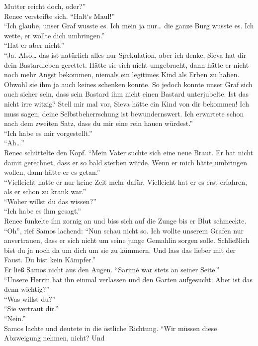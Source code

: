 Mutter reicht doch, oder?''\\
Renec versteifte sich. ``Halt‘s Maul!''\\
``Ich glaube, unser Graf wusste es. Ich mein ja nur… die ganze Burg wusste es. Ich wette, er wollte 
dich umbringen.''\\
``Hat er aber nicht.''\\
``Ja. Also… das ist natürlich alles nur Spekulation, aber ich denke, Sieva hat dir dein 
Bastardleben gerettet. Hätte sie sich nicht umgebracht, dann hätte er nicht noch mehr Angst 
bekommen, niemals ein legitimes Kind als Erben zu haben. Obwohl sie ihm ja auch keines schenken 
konnte. So jedoch konnte unser Graf sich auch sicher sein, dass sein Bastard ihm nicht einen 
Bastard unterjubelte. Ist das nicht irre witzig? Stell mir mal vor, Sieva hätte ein Kind von dir 
bekommen! Ich muss sagen, deine Selbstbeherrschung ist bewundernswert. Ich erwartete schon nach dem 
zweiten Satz, dass du mir eine rein hauen würdest.''\\
``Ich habe es mir vorgestellt.''\\
``Ah…''\\
Renec schüttelte den Kopf. ``Mein Vater suchte sich eine neue Braut. Er hat nicht damit gerechnet, 
dass er so bald sterben würde. Wenn er mich hätte umbringen wollen, dann hätte er es getan.''\\
``Vielleicht hatte er nur keine Zeit mehr dafür. Vielleicht hat er es erst erfahren, als er schon 
zu krank war.''\\
``Woher willst du das wissen?''\\
``Ich habe es ihm gesagt.''\\
Renec funkelte ihn zornig an und biss sich auf die Zunge bis er Blut schmeckte.\\
``Oh'', rief Samos lachend: ``Nun schau nicht so. Ich wollte unserem Grafen nur anvertrauen, 
dass er sich nicht um seine junge Gemahlin sorgen solle. Schließlich bist du ja noch da um dich um 
sie zu kümmern. Und lass das lieber mit der Faust. Du bist kein Kämpfer.''\\
Er ließ Samos nicht aus den Augen. ``Sarimé war stets an seiner Seite.''\\
``Unsere Herrin hat ihn einmal verlassen und den Garten aufgesucht. Aber ist das denn wichtig?''\\
``Was willst du?''\\
``Sie vertraut dir.''\\
``Nein.''\\
Samos lachte und deutete in die östliche Richtung. ``Wir müssen diese Abzweigung nehmen, nicht? Und 
